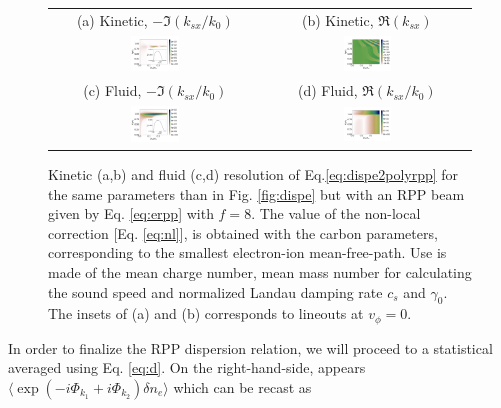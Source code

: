 \documentclass[
 reprint,
 amsmath,amssymb,
 aps,
]{revtex4-1}
\begin{document}
\begin{figure}
\begin{tabular}{cc}
(a) Kinetic, $-\Im(k_{sx}/k_0)$ &
(b)  Kinetic, $\Re(k_{sx})$ \\
\includegraphics[width=0.24\textwidth]{Grpp_CH_new.png}&
\includegraphics[width=0.24\textwidth]{krpp_CH.png}\\
(c) Fluid, $-\Im(k_{sx}/k_0)$  &
(d) Fluid, $\Re(k_{sx}/k_0)$  \\
\includegraphics[width=0.24\textwidth]{Gfrpp_CH_new.png}&
\includegraphics[width=0.24\textwidth]{kfrpp_CH.png}
\end{tabular}
\caption{ \label{fig:dispeCHrpp}  
Kinetic (a,b) and fluid (c,d) resolution of Eq.\eqref{eq:dispe2polyrpp} for  the same parameters than in Fig. \ref{fig:dispe} but with an RPP beam given by Eq. \eqref{eq:erpp} with $f=8$.  The value of the non-local correction [Eq. \eqref{eq:nl}], is obtained with the carbon parameters, corresponding to the smallest electron-ion mean-free-path. Use is made of the mean charge number, mean mass number   for calculating the sound speed and normalized Landau damping rate $c_s$ and $\gamma_0$.
The insets  of (a) and (b) corresponds to lineouts at $v_\phi=0$. 
 }
\end{figure}
In order to finalize the RPP dispersion relation, we will proceed to a statistical averaged using Eq. \eqref{eq:d}. On the right-hand-side, appears $\langle\exp(-i\Phi_{k_1}+i\Phi_{k_2})\delta n_e \rangle$ which can be recast as
\end{document}
